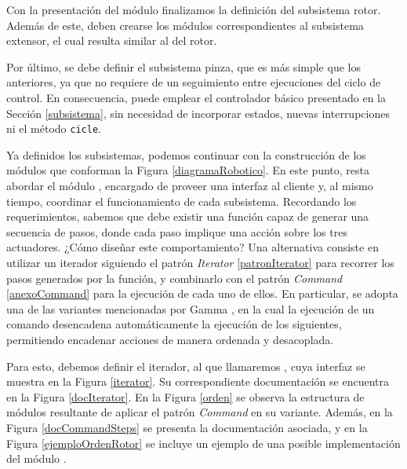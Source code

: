 Con la presentación del módulo \RobotCtrl finalizamos la definición del subsistema rotor. Además de este, deben crearse los módulos correspondientes al subsistema extensor, el cual resulta similar al del rotor.

Por último, se debe definir el subsistema pinza, que es más simple que los anteriores, ya que no requiere de un seguimiento entre ejecuciones del ciclo de control. En consecuencia, puede emplear el controlador básico presentado en la Sección \ref{subsistema}, sin necesidad de incorporar estados, nuevas interrupciones ni el método \verb|cicle|.

Ya definidos los subsistemas, podemos continuar con la construcción de los módulos que conforman la Figura \ref{diagramaRobotico}. En este punto, resta abordar el módulo \MainController, encargado de proveer una interfaz al cliente y, al mismo tiempo, coordinar el funcionamiento de cada subsistema. Recordando los requerimientos, sabemos que debe existir una función capaz de generar una secuencia de pasos, donde cada paso implique una acción sobre los tres actuadores. ¿Cómo diseñar este comportamiento? Una alternativa consiste en utilizar un iterador siguiendo el patrón \textit{Iterator} \ref{patronIterator} para recorrer los pasos generados por la función, y combinarlo con el patrón \textit{Command} \ref{anexoCommand} para la ejecución de cada uno de ellos. En particular, se adopta una de las variantes mencionadas por Gamma \cite{Gamma:1995:DPE:186897}, en la cual la ejecución de un comando desencadena automáticamente la ejecución de los siguientes, permitiendo encadenar acciones de manera ordenada y desacoplada.

Para esto, debemos definir el iterador, al que llamaremos \Steps, cuya interfaz se muestra en la Figura \ref{iterator}. Su correspondiente documentación se encuentra en la Figura \ref{docIterator}. En la Figura \ref{orden} se observa la estructura de módulos resultante de aplicar el patrón \textit{Command} en su variante. Además, en la Figura \ref{docCommandSteps} se presenta la documentación asociada, y en la Figura \ref{ejemploOrdenRotor} se incluye un ejemplo de una posible implementación del módulo \OrdenRotor.

